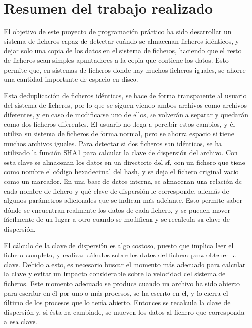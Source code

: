 \documentclass[12pt,a4paper]{article}
\begin{document}

\tableofcontents
\newpage
\section{Resumen del trabajo realizado}

El objetivo de este proyecto de programación práctico ha sido desarrollar un sistema de ficheros capaz de detectar cuándo se almacenan ficheros idénticos, y dejar solo una copia de los datos en el sistema de ficheros, haciendo que el resto de ficheros sean simples apuntadores a la copia que contiene los datos. Esto permite que, en sistemas de ficheros donde hay muchos ficheros iguales, se ahorre una cantidad importante de espacio en disco.

Esta deduplicación de ficheros idénticos, se hace de forma transparente al usuario del sistema de ficheros, por lo que se siguen viendo ambos archivos como archivos diferentes, y en caso de modificarse uno de ellos, se volverán a separar y quedarán como dos ficheros diferentes. El usuario no llega a percibir estos cambios, y él utiliza su sistema de ficheros de forma normal, pero se ahorra espacio si tiene muchos archivos iguales.
Para detectar si dos ficheros son idénticos, se ha utilizado la función SHA1 para calcular la clave de dispersión del archivo. Con esta clave se almacenan los datos en un directorio del sf, con un fichero que tiene como nombre el código hexadecimal del hash, y se deja el fichero original vacío como un marcador. En una base de datos interna, se almacenan una relación de cada nombre de fichero y qué clave de dispersión le corresponde, además de algunos parámetros adicionales que se indican más adelante. Esto permite saber dónde se encuentran realmente los datos de cada fichero, y se pueden mover fácilmente de un lugar a otro cuando se modifican y se recalcula su clave de dispersión.

El cálculo de la clave de dispersión es algo costoso, puesto que implica leer el fichero completo, y realizar cálculos sobre los datos del fichero para obtener la clave. Debido a esto, es necesario buscar el momento más adecuado para calcular la clave y evitar un impacto considerable sobre la velocidad del sistema de ficheros. Este momento adecuado se produce cuando un archivo ha sido abierto para escribir en él por uno o más procesos, se ha escrito en él, y lo cierra el último de los procesos que lo tenía abierto. Entonces se recalcula la clave de dispersión y, si ésta ha cambiado, se mueven los datos al fichero que corresponda a esa clave.
\end{document}
